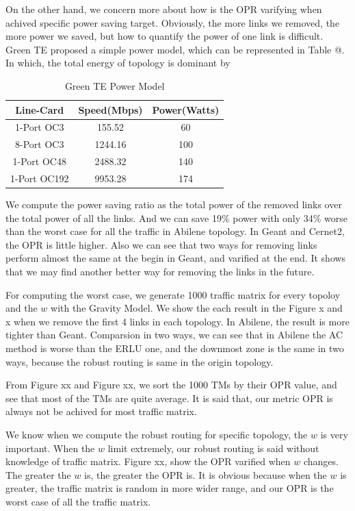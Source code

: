 \documentclass[conference]{IEEEtran}
\makeatletter
\newcommand{\Rmnum}[1]{\expandafter\@slowromancap\romannumeral #1@}
\makeatother
\begin{document}
On the other hand, we concern more about how is the OPR varifying when achived specific power saving target. Obviously, the more 
links we removed, the more power we saved, but how to quantify the power of one link is difficult. Green TE \cite{networking:greente} 
proposed a simple power model, which can be represented in Table \Rmnum{2}. In which, the total energy of topology is dominant by  

\begin{table}[!t]
\renewcommand{\arraystretch}{1}
\caption{Green TE Power Model}
\label{power model}
\centering
\begin{tabular}{|c|c|c|}
\hline
\bfseries Line-Card & \bfseries Speed(Mbps) & \bfseries Power(Watts) \\
\hline
1-Port OC3 & 155.52 & 60 \\
\hline
8-Port OC3 & 1244.16 & 100 \\
\hline
1-Port OC48 & 2488.32 & 140 \\
\hline
1-Port OC192 & 9953.28 & 174 \\
\hline
\end{tabular}
\end{table}

We compute the power saving ratio as the total power of the removed links over the total power of all the links. And we can
save 19\% power with only 34\% worse than the worst case for all the traffic in Abilene topology. In Geant and Cernet2, 
the OPR is little higher. Also we can see that two ways for removing links perform almost the same at the begin in Geant,
and varified at the end. It shows that we may find another better way for removing the links in the future.


For computing the worst case, we generate 1000 traffic matrix for every topoloy and the $w$ with the Gravity Model.
We show the each result in the Figure x and x when we remove the first 4 links in each topology. In Abilene, the result 
is more tighter than Geant. Comparsion in two ways, we can see that in Abilene the AC method is worse than the ERLU one,
and the downmost zone is the same in two ways, because the robust routing is same in the origin topology.


From Figure xx and Figure xx, we sort the 1000 TMs by their OPR value, and see that most of the TMs are quite average. 
It is said that, our metric OPR is always not be achived for most traffic matrix.


We know when we compute the robust routing for specific topology, the $w$ is very important. When the $w$ limit extremely,
our robust routing is said without knowledge of traffic matrix. Figure xx, show the OPR varified when $w$ changes. The greater
the $w$ is, the greater the OPR is. It is obvious because when the $w$ is greater, the traffic matrix is random in more wider 
range, and our OPR is the worst case of all the traffic matrix.
\end{document}
